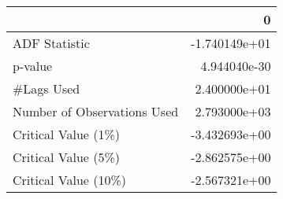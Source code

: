 \begin{tabular}{lr}
\toprule
{} &             0 \\
\midrule
ADF Statistic               & -1.740149e+01 \\
p-value                     &  4.944040e-30 \\
\#Lags Used                  &  2.400000e+01 \\
Number of Observations Used &  2.793000e+03 \\
Critical Value (1\%)         & -3.432693e+00 \\
Critical Value (5\%)         & -2.862575e+00 \\
Critical Value (10\%)        & -2.567321e+00 \\
\bottomrule
\end{tabular}
